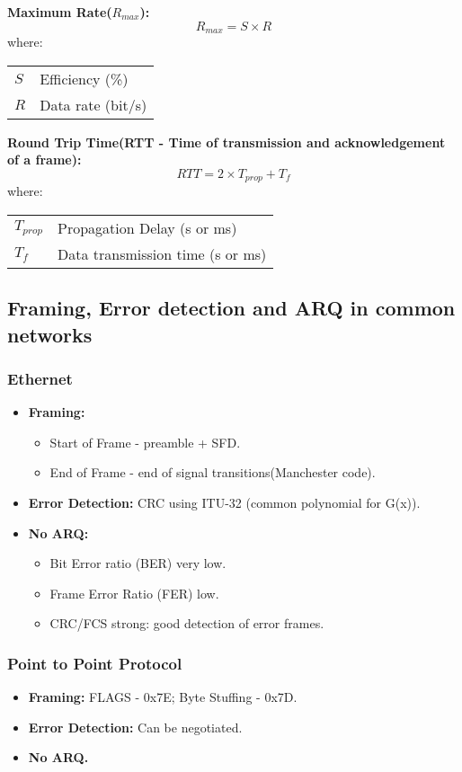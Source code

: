 \documentclass[../resumosRCOM.tex]{subfiles}
\makeatletter
\newenvironment{conditions}
  {\par\vspace{\abovedisplayskip}\noindent\begin{tabular}{>{$}l<{$} @{${}={}$} l}}
  {\end{tabular}\par\vspace{\belowdisplayskip}}
\makeatother
\begin{document}
\textbf{Maximum Rate($R_{max}$):}
\begin{equation}
    {R_{max}}={S}\times{R}
\end{equation}
where:
\begin{conditions}
   S     &  Efficiency (\%) \\
   R &  Data rate (bit/s)
\end{conditions}

\textbf{Round Trip Time(RTT - Time of transmission and acknowledgement of a frame):} 
\begin{equation}
    {RTT}= 2 \times {T_{prop}} + {T_f}
\end{equation}
where:
\begin{conditions}
   T_{prop}     &  Propagation Delay (s or ms) \\
   T_f &   Data transmission time (s or ms)
\end{conditions}

\subsection{Framing, Error detection and ARQ in common networks}
\subsubsection{Ethernet}
\begin{itemize}
    \item \textbf{Framing:} 
    \begin{itemize}
        \item Start of Frame - preamble + SFD.
        \item End of Frame - end of signal transitions(Manchester code).
    \end{itemize}
    \item \textbf{Error Detection:} CRC using ITU-32 (common polynomial for G(x)).
    \item \textbf{No ARQ:} 
    \begin{itemize}
        \item Bit Error ratio (BER) very low.
        \item Frame Error Ratio (FER) low.
        \item CRC/FCS strong: good detection of error frames.
    \end{itemize}
\end{itemize}
\subsubsection{Point to Point Protocol}
\begin{itemize}
    \item \textbf{Framing:} FLAGS - 0x7E; Byte Stuffing - 0x7D.
    \item \textbf{Error Detection:} Can be negotiated.
    \item \textbf{No ARQ.}
\end{itemize}
\end{document}
